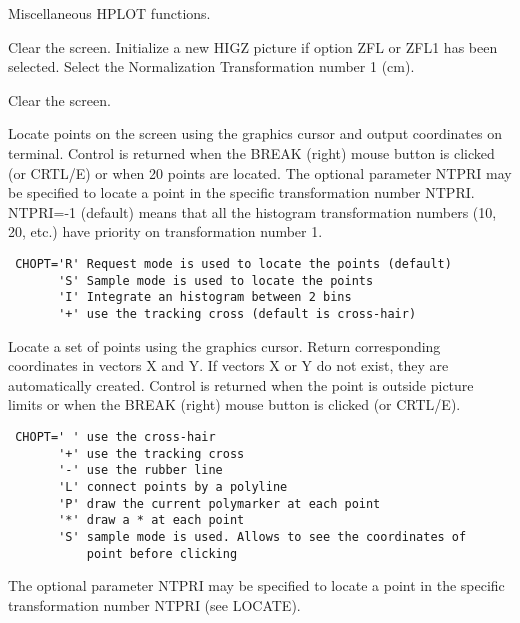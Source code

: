 \BEGTEXT
Miscellaneous HPLOT functions.
\ENDTEXT

\BEGTEXT
Clear the screen.
Initialize a new HIGZ picture if option ZFL or ZFL1 has been selected.
Select the Normalization Transformation number 1 (cm).
\ENDTEXT

\BEGTEXT
Clear the screen.
\ENDTEXT

\BEGARG
{}
\ENDARG
\BEGTEXT
Locate points on the screen using the graphics cursor
and output coordinates on terminal. Control is returned when
the BREAK (right) mouse button is clicked (or CRTL/E) or
when 20 points are located.
The optional parameter NTPRI may be specified to locate
a point in the specific transformation number NTPRI.
NTPRI=-1 (default) means that all the histogram transformation
numbers (10, 20, etc.) have priority on transformation number 1.
\begin{verbatim}
 CHOPT='R' Request mode is used to locate the points (default)
       'S' Sample mode is used to locate the points
       'I' Integrate an histogram between 2 bins
       '+' use the tracking cross (default is cross-hair)
\end{verbatim}
\ENDTEXT

\BEGARG
{}
\ENDARG
\BEGTEXT
Locate a set of points using the graphics cursor.
Return corresponding coordinates in vectors X and Y.
If vectors X or Y do not exist, they are automatically created.
Control is returned when the point is outside picture limits
or when the BREAK (right) mouse button is clicked (or CRTL/E).
\begin{verbatim}
 CHOPT=' ' use the cross-hair
       '+' use the tracking cross
       '-' use the rubber line
       'L' connect points by a polyline
       'P' draw the current polymarker at each point
       '*' draw a * at each point
       'S' sample mode is used. Allows to see the coordinates of
           point before clicking
\end{verbatim}
The optional parameter NTPRI may be specified to locate
a point in the specific transformation number NTPRI (see LOCATE).
\ENDTEXT

